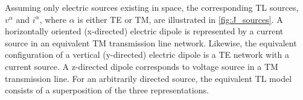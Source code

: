 \documentclass[12pt]{article}
\begin{document}
%
Assuming only electric sources existing in space, the corresponding TL sources, $v^{\alpha}$ and $i^{\alpha}$, where $\alpha$ is either TE or TM, are illustrated in \ref{fig:J_sources}. A horizontally oriented (x-directed) electric dipole is represented by a current source in an equivalent TM transmission line network. Likewise, the equivalent configuration of a vertical (y-directed) electric dipole is a TE network with a current source. A z-directed dipole corresponds to voltage source in a TM transmission line. For an arbitrarily directed source, the equivalent TL model consists of a superposition of the three representations.
%




\clearpage %
% 


\end{document}

